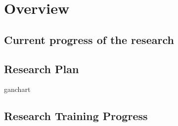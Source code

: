 \chapter{Overview}


\section{Current progress of the research}
\section{Research Plan}
ganchart
\section{Research Training Progress}
